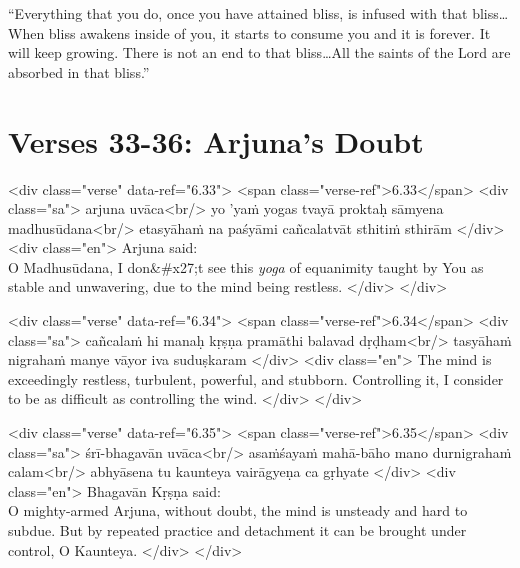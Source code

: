 \enquote{Everything that you do, once you have attained bliss, is infused with that bliss\ldots When bliss awakens inside of you, it starts to consume you and it is forever. It will keep growing. There is not an end to that bliss\ldots All the saints of the Lord are absorbed in that bliss.}

\section{Verses 33-36: Arjuna's Doubt}\label{sec-verses-33-36-arjuna-s-doubt}


\begin{html}
<div class="verse" data-ref="6.33">
  <span class="verse-ref">6.33</span>
  <div class="sa">
    arjuna uvāca<br/>
    yo ’yaṁ yogas tvayā proktaḥ sāmyena madhusūdana<br/>
    etasyāhaṁ na paśyāmi cañcalatvāt sthitiṁ sthirām
  </div>
  <div class="en">
    \hspace*{1em}Arjuna said: \\ O Madhusūdana, I don&#x27;t see this \textit{yoga} of equanimity taught by You as stable and unwavering, due to the mind being restless.
  </div>
</div>
\end{html}



\begin{html}
<div class="verse" data-ref="6.34">
  <span class="verse-ref">6.34</span>
  <div class="sa">
    cañcalaṁ hi manaḥ kṛṣṇa pramāthi balavad dṛḍham<br/>
    tasyāhaṁ nigrahaṁ manye vāyor iva suduṣkaram
  </div>
  <div class="en">
    The mind is exceedingly restless, turbulent, powerful, and stubborn. Controlling it, I consider to be as difficult as controlling the wind.
  </div>
</div>
\end{html}



\begin{html}
<div class="verse" data-ref="6.35">
  <span class="verse-ref">6.35</span>
  <div class="sa">
    śrī-bhagavān uvāca<br/>
    asaṁśayaṁ mahā-bāho mano durnigrahaṁ calam<br/>
    abhyāsena tu kaunteya vairāgyeṇa ca gṛhyate
  </div>
  <div class="en">
    \hspace*{1em}Bhagavān Kṛṣṇa said: \\ O mighty-armed Arjuna, without doubt, the mind is unsteady and hard to subdue. But by repeated practice and detachment it can be brought under control, O Kaunteya.
  </div>
</div>
\end{html}



